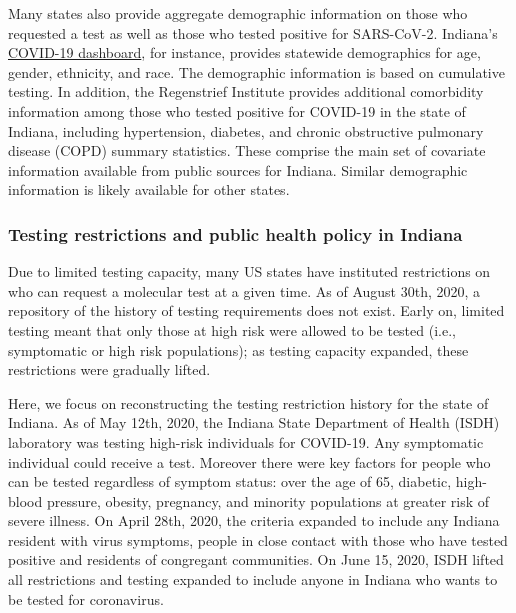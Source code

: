 \documentclass[11pt]{amsart}
\begin{document}
Many states also provide aggregate demographic information on those who requested a test as well as those who tested positive for SARS-CoV-2. Indiana's \href{https://www.coronavirus.in.gov/2393.htm}{COVID-19 dashboard}, for instance, provides statewide demographics for age, gender, ethnicity, and race.  The demographic information is based on cumulative testing.  In addition, the Regenstrief Institute provides additional comorbidity information among those who tested positive for COVID-19 in the state of Indiana, including hypertension, diabetes, and chronic obstructive pulmonary disease (COPD) summary statistics. These comprise the main set of covariate information available from public sources for Indiana. Similar demographic information is likely available for other states.
%




\subsubsection{Testing restrictions and public health policy in Indiana}

Due to limited testing capacity, many US states have instituted restrictions on who can request a molecular test at a given time.
As of August 30th, 2020, a repository of the history of testing requirements does not exist.  Early on, limited testing meant that only those at high risk were allowed to be tested (i.e., symptomatic or high risk populations); as testing capacity expanded, these restrictions were gradually lifted.

Here, we focus on reconstructing the testing restriction history for the state of Indiana. As of May 12th, 2020, the Indiana State Department of Health (ISDH) laboratory was testing high-risk individuals for COVID-19. Any symptomatic individual could receive a test.  Moreover there were key factors for people who can be tested regardless of symptom status: over the age of 65, diabetic, high-blood pressure, obesity, pregnancy, and minority populations at greater risk of severe illness.
On April 28th, 2020, the criteria expanded to include any Indiana resident with virus symptoms, people in close contact with those who have tested positive and residents of congregant communities.
On June 15, 2020, ISDH lifted all restrictions and testing expanded to include anyone in Indiana who wants to be tested for coronavirus.
\end{document}
